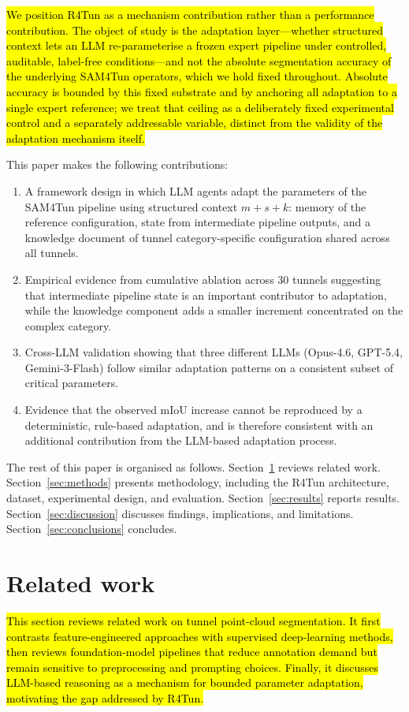 \documentclass[a4paper,fleqn]{cas-dc}
\begin{document}
{\hl{We position R4Tun as a mechanism contribution rather than a performance contribution. The object of study is the adaptation layer---whether structured context lets an LLM re-parameterise a frozen expert pipeline under controlled, auditable, label-free conditions---and not the absolute segmentation accuracy of the underlying SAM4Tun operators, which we hold fixed throughout. Absolute accuracy is bounded by this fixed substrate and by anchoring all adaptation to a single expert reference; we treat that ceiling as a deliberately fixed experimental control and a separately addressable variable, distinct from the validity of the adaptation mechanism itself.}

This paper makes the following contributions:
\begin{enumerate}
\item A framework design in which LLM agents adapt the parameters of the SAM4Tun pipeline using structured context $m+s+k$: memory of the reference configuration, state from intermediate pipeline outputs, and a knowledge document of tunnel category-specific configuration shared across all tunnels.
\item Empirical evidence from cumulative ablation across 30 tunnels suggesting that intermediate pipeline state is an important contributor to adaptation, while the knowledge component adds a smaller increment concentrated on the complex category.
\item Cross-LLM validation showing that three different LLMs (Opus-4.6, GPT-5.4, Gemini-3-Flash) follow similar adaptation patterns on a consistent subset of critical parameters.
\item Evidence that the observed mIoU increase cannot be reproduced by a deterministic, rule-based adaptation, and is therefore consistent with an additional contribution from the LLM-based adaptation process.
\end{enumerate}

The rest of this paper is organised as follows. Section~\ref{sec:related} reviews related work. Section~\ref{sec:methods} presents methodology, including the R4Tun architecture, dataset, experimental design, and evaluation. Section~\ref{sec:results} reports results. Section~\ref{sec:discussion} discusses findings, implications, and limitations. Section~\ref{sec:conclusions} concludes.

\section{Related work}\label{sec:related}
\hl{This section reviews related work on tunnel point-cloud segmentation. It first contrasts feature-engineered approaches with supervised deep-learning methods, then reviews foundation-model pipelines that reduce annotation demand but remain sensitive to preprocessing and prompting choices. Finally, it discusses LLM-based reasoning as a mechanism for bounded parameter adaptation, motivating the gap addressed by R4Tun.}

}
\end{document}
